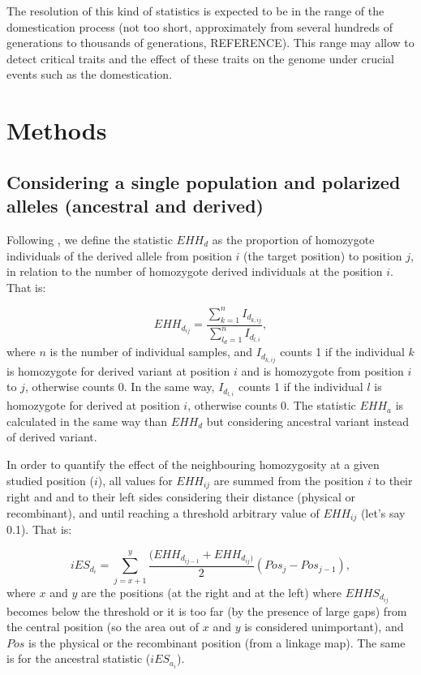 \documentclass[a4paper,11pt]{article}
\begin{document}
The resolution of this kind of statistics is expected to be in the range of the domestication process (not too short, approximately from several hundreds of generations to  thousands of generations, REFERENCE). This range may allow to detect critical traits and the effect of these traits on the genome under crucial events such as the domestication.

\section{Methods}
\subsection{Considering a single population and polarized alleles (ancestral and derived)}
Following \cite{Sabeti:2002fv}, we define the statistic $EHH_d$ as the proportion of homozygote individuals of the derived allele from position $i$ (the target position) to position $j$, in relation to the number of homozygote derived individuals at the position $i$.  That is:

 \begin{equation}
 EHH_{d_{ij}} = \frac{\sum_{k=1}^{n}I_{d_{k,ij}}}{\sum_{l_d=1}^{n}I_{d_{l,i}}},
 \end{equation}
where $n$ is the number of individual samples, and $I_{d_{k,ij}}$ counts 1 if the individual $k$ is homozygote for derived variant at position $i$ and is homozygote from position $i$ to $j$, otherwise counts 0. In the same way, $I_{d_{l,i}}$ counts 1 if the individual $l$ is homozygote for derived at position $i$, otherwise counts 0. The statistic $EHH_a$ is calculated in the same way than $EHH_d$ but considering ancestral variant instead of derived variant.  

In order to quantify the effect of the neighbouring homozygosity at a given studied position ($i$),  all values for $EHH_{ij}$ are summed from the position $i$ to their right and and to their left sides considering their distance (physical or recombinant), and until reaching a threshold arbitrary value of $EHH_{ij}$ (let's say 0.1). That is: 

\begin{equation}
 iES_{d_i} = \sum_{j=x+1}^{y}\frac{(EHH_{d_{ij-1}} + EHH_{d_{ij})}}{2} (Pos_{j} - Pos_{j-1}),
 \end{equation}
where $x$ and $y$ are the positions (at the right and at the left) where $EHHS_{d_{ij}}$ becomes below the threshold or it is too far (by the presence of large gaps) from the central position (so the area out of $x$ and $y$ is considered unimportant), and $Pos$ is the physical or the recombinant position (from a linkage map). The same is for the ancestral statistic ($iES_{a_i}$).
\end{document}
